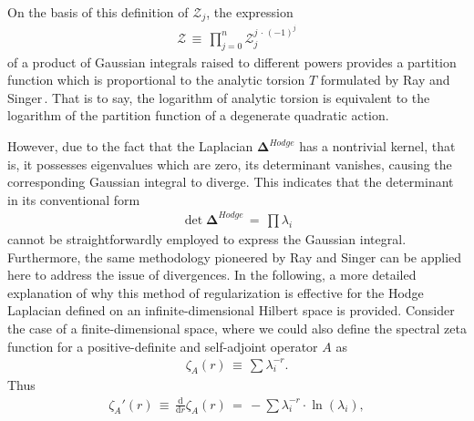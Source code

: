 On the basis of this definition of $\mathcal{Z}_{j}$, the expression
\begin{equation}\label{eq: product of partition functions}
    \begin{split}
        \mathcal{Z}\,\equiv\,\prod_{j=0}^{n}\mathcal{Z}_{j}^{j\,\cdot\,\left(-1\right)^{j}}
    \end{split}
\end{equation}
of a product of Gaussian integrals raised to different powers provides a partition function which is proportional to the analytic torsion $T$ formulated by Ray and Singer\,\cite{ASchwarz1979}. That is to say, the logarithm of analytic torsion is equivalent to the logarithm of the partition function of a degenerate quadratic action. 
\par However, due to the fact that the Laplacian $\mathbf{\Delta}^{Hodge}$ has a nontrivial kernel, that is, it possesses eigenvalues which are zero, its determinant vanishes, causing the corresponding Gaussian integral to diverge. This indicates that the determinant in its conventional form
\begin{equation}
    \begin{split}
        \det\mathbf{\Delta}^{Hodge}\,=\,\prod\lambda_i
    \end{split}
\end{equation}
cannot be straightforwardly employed to express the Gaussian integral. Furthermore, the same methodology pioneered by Ray and Singer can be applied here to address the issue of divergences. In the following, a more detailed explanation of why this method of regularization is effective for the Hodge Laplacian defined on an infinite-dimensional Hilbert space is provided. Consider the case of a finite-dimensional space, where we could also define the spectral zeta function for a positive-definite and self-adjoint operator $A$ as
\begin{equation}\label{eq: definition of zeta function}
    \begin{split}
        \zeta_{A}\left(r\right)\,\equiv\,\sum\lambda_{i}^{-r}.
    \end{split}
\end{equation}
Thus
\begin{equation}
    \begin{split}
        \zeta_{A}'\left(r\right)\,\equiv\,\frac{\mathrm{d}}{\mathrm{d}r}\zeta_{A}\left(r\right)\,=\,-\sum\lambda_{i}^{-r}\cdot \ln\left(\lambda_{i}\right),
    \end{split}
\end{equation}
